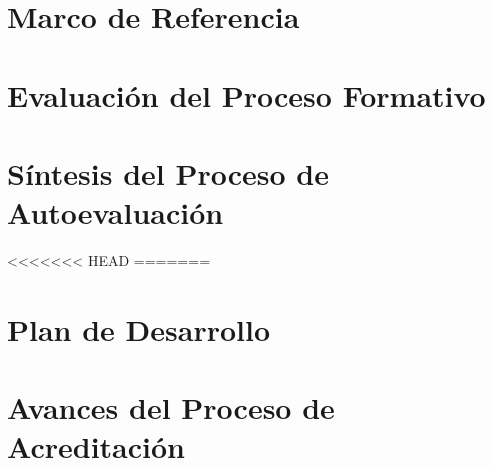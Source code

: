 \documentclass[11pt,fleqn]{book} %
\begin{document}

\chapter{Marco de Referencia}





\chapter{Evaluación del Proceso Formativo}





\chapter{Síntesis del Proceso de Autoevaluación}


<<<<<<< HEAD
=======

\chapter{Plan de Desarrollo}



\chapter{Avances del Proceso de Acreditación}

\end{document}
